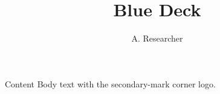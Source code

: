 \documentclass{beamer}
\title{Blue Deck}
\author{A. Researcher}
\begin{document}
{
\begin{frame}[plain]\titlepage\end{frame}
}
\begin{frame}{Content}
Body text with the secondary-mark corner logo.
\end{frame}
\end{document}
